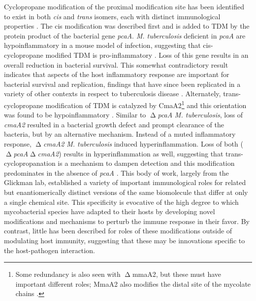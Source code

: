 Cyclopropane modification of the proximal modification site has been identified to exist in both \textit{cis} and \textit{trans} isomers, each with distinct immunological properties \citep{Glickman2000, Glickman2001, Rao2005, Rao2006}. The cis modification was described first and is added to TDM by the protein product of the bacterial gene \textit{pcaA}. \textit{M. tuberculosis} deficient in \textit{pcaA} are hypoinflammatory in a mouse model of infection, suggesting that cis\hyp{}cyclopropane modified TDM is pro\hyp{}inflammatory \citep{Rao2005}. Loss of this gene results in an overall reduction in bacterial survival. This somewhat contradictory result indicates that aspects of the host inflammatory response are important for bacterial survival and replication, findings that have since been replicated in a variety of other contexts in respect to tuberculosis disease \citep{Huynh2011, Sasindran2011, Tobin2012, Koul2004, Flynn2005}. Alternately, trans\hyp{}cyclopropane modification of TDM is catalyzed by CmaA2\footnote{Some redundancy is also seen with $\upDelta$mmaA2, but these must have important different roles; MmaA2 also modifies the distal site of the mycolate chains \citep{Barkan2010, Glickman2003}.} and this orientation was found to be hypoinflammatory \citep{Rao2006}. Similar to $\upDelta$\textit{pcaA} \textit{M. tuberculosis}, loss of \textit{cmaA2} resulted in a bacterial growth defect and prompt clearance of the bacteria, but by an alternative mechanism. Instead of a muted inflammatory response, $\upDelta$\textit{cmaA2} \textit{M. tuberculosis} induced hyperinflammation. Loss of both ($\upDelta$\textit{pcaA}$\upDelta$\textit{cmaA2}) results in hyperinflammation as well, suggesting that trans\hyp{}cyclopropanation is a mechanism to dampen detection and this modification predominates in the absence of \textit{pcaA} \citep{Barkan2012}. This body of work, largely from the Glickman lab, established a variety of important immunological roles for related but enantiomerically distinct versions of the same biomolecule that differ at only a single chemical site. This specificity is evocative of the high degree to which mycobacterial species have adapted to their hosts by developing novel modifications and mechanisms to perturb the immune response in their favor. By contrast, little has been described for roles of these modifications outside of modulating host immunity, suggesting that these may be innovations specific to the host\hyp{}pathogen interaction.

